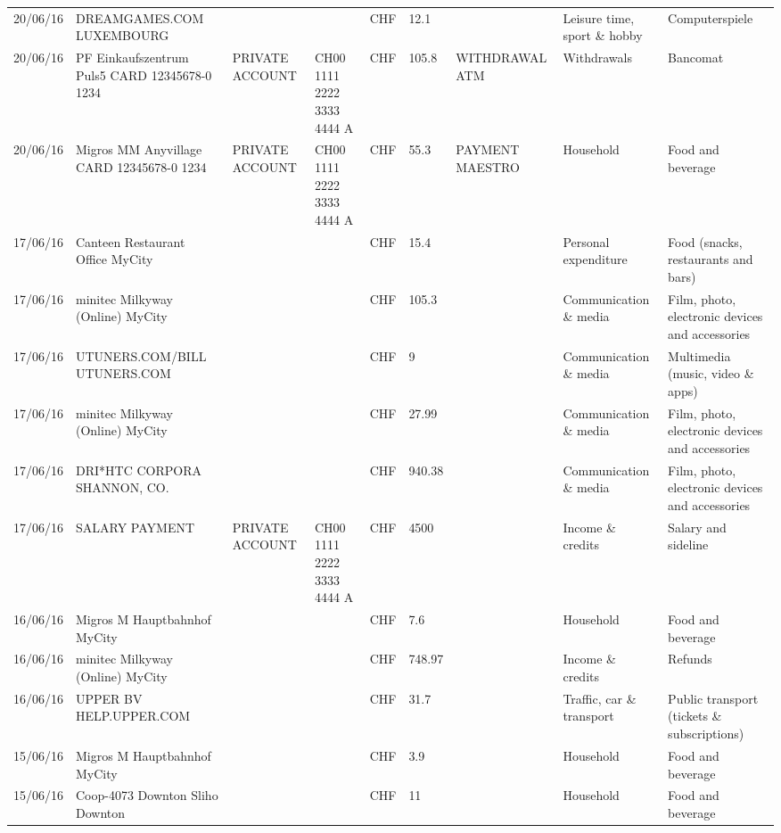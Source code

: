 \begin{landscape}
\begin{center}
\begin{longtable}{lllllllll}
		20/06/16 & DREAMGAMES.COM           LUXEMBOURG &       &       & CHF   & 12.1  &       & Leisure time, sport \& hobby & Computerspiele \\
		20/06/16 & PF Einkaufszentrum Puls5 CARD 12345678-0 1234 & PRIVATE ACCOUNT & CH00 1111 2222 3333 4444 A & CHF   & 105.8 & WITHDRAWAL ATM & Withdrawals & Bancomat \\
		20/06/16 & Migros MM Anyvillage CARD 12345678-0 1234 & PRIVATE ACCOUNT & CH00 1111 2222 3333 4444 A & CHF   & 55.3  & PAYMENT MAESTRO & Household & Food and beverage \\
		17/06/16 & Canteen Restaurant Office      MyCity &       &       & CHF   & 15.4  &       & Personal expenditure & Food (snacks, restaurants and bars) \\
		17/06/16 & minitec Milkyway (Online) MyCity &       &       & CHF   & 105.3 &       & Communication \& media & Film, photo, electronic devices and accessories \\
		17/06/16 & UTUNERS.COM/BILL          UTUNERS.COM &       &       & CHF   & 9     &       & Communication \& media & Multimedia (music, video \& apps) \\
		17/06/16 & minitec Milkyway (Online) MyCity &       &       & CHF   & 27.99 &       & Communication \& media & Film, photo, electronic devices and accessories \\
		17/06/16 & DRI*HTC CORPORA          SHANNON, CO. &       &       & CHF   & 940.38 &       & Communication \& media & Film, photo, electronic devices and accessories \\
		17/06/16 & SALARY PAYMENT & PRIVATE ACCOUNT & CH00 1111 2222 3333 4444 A & CHF   & 4500  &       & Income \& credits & Salary and sideline \\
		16/06/16 & Migros M Hauptbahnhof    MyCity &       &       & CHF   & 7.6   &       & Household & Food and beverage \\
		16/06/16 & minitec Milkyway (Online) MyCity &       &       & CHF   & 748.97 &       & Income \& credits & Refunds \\
		16/06/16 & UPPER BV                  HELP.UPPER.COM &       &       & CHF   & 31.7  &       & Traffic, car \& transport & Public transport (tickets \& subscriptions) \\
		15/06/16 & Migros M Hauptbahnhof    MyCity &       &       & CHF   & 3.9   &       & Household & Food and beverage \\
		15/06/16 & Coop-4073 Downton Sliho   Downton &       &       & CHF   & 11    &       & Household & Food and beverage \\

\end{longtable}
\end{center}
\end{landscape}
